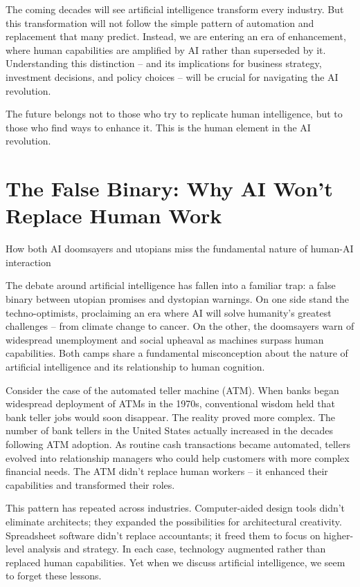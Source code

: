 \documentclass[
  Letterpaper,
]{scrbook}
\begin{document}
The coming decades will see artificial intelligence transform every
industry. But this transformation will not follow the simple pattern of
automation and replacement that many predict. Instead, we are entering
an era of enhancement, where human capabilities are amplified by AI
rather than superseded by it. Understanding this distinction -- and its
implications for business strategy, investment decisions, and policy
choices -- will be crucial for navigating the AI revolution.

The future belongs not to those who try to replicate human intelligence,
but to those who find ways to enhance it. This is the human element in
the AI revolution.


\chapter{The False Binary: Why AI Won't Replace Human
Work}\label{the-false-binary-why-ai-wont-replace-human-work}

How both AI doomsayers and utopians miss the fundamental nature of
human-AI interaction

\hfill\break

The debate around artificial intelligence has fallen into a familiar
trap: a false binary between utopian promises and dystopian warnings. On
one side stand the techno-optimists, proclaiming an era where AI will
solve humanity's greatest challenges -- from climate change to cancer.
On the other, the doomsayers warn of widespread unemployment and social
upheaval as machines surpass human capabilities. Both camps share a
fundamental misconception about the nature of artificial intelligence
and its relationship to human cognition.

Consider the case of the automated teller machine (ATM). When banks
began widespread deployment of ATMs in the 1970s, conventional wisdom
held that bank teller jobs would soon disappear. The reality proved more
complex. The number of bank tellers in the United States actually
increased in the decades following ATM adoption. As routine cash
transactions became automated, tellers evolved into relationship
managers who could help customers with more complex financial needs. The
ATM didn't replace human workers -- it enhanced their capabilities and
transformed their roles.

This pattern has repeated across industries. Computer-aided design tools
didn't eliminate architects; they expanded the possibilities for
architectural creativity. Spreadsheet software didn't replace
accountants; it freed them to focus on higher-level analysis and
strategy. In each case, technology augmented rather than replaced human
capabilities. Yet when we discuss artificial intelligence, we seem to
forget these lessons.
\end{document}
